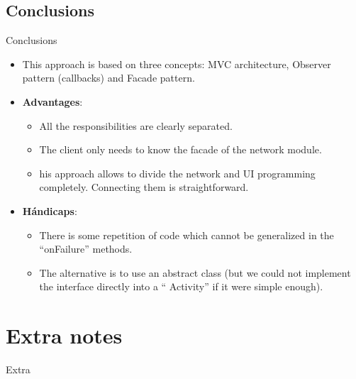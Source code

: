 \documentclass{beamer}
\begin{document}
\subsection{Conclusions}
\begin{frame}[fragile]{Conclusions}
\begin{itemize}
\item This approach is based on three concepts: MVC architecture, Observer pattern (callbacks) and Facade pattern.
\item {\bf Advantages}:
\begin{itemize}

\item All the responsibilities are clearly separated.
\item The client only needs to know the facade of the network module.
\item his approach allows to divide the network and UI programming completely. Connecting them is straightforward.
\end{itemize}

\item {\bf Hándicaps}: 
\begin{itemize}
\item There is some repetition of code which cannot be generalized in the ``onFailure'' methods.
\item The alternative is to use an abstract class (but we could not implement the interface  directly into a `` Activity'' if it were simple enough).
\end{itemize}
\end{itemize}
\end{frame}

\section{Extra notes}
\begin{frame}{Extra}
\end{frame}
\end{document}
